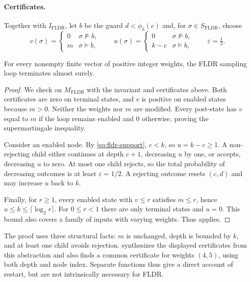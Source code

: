\paragraph{Certificates.}
Together with $I_{\mathrm{FLDR}}$, let $b$ be the guard
$d<\phi_h(c)$ and, for $\sigma\in S_{\mathrm{FLDR}}$, choose
\[
 v(\sigma)=\begin{cases}0&\sigma\not\models b,\\m&\sigma\models b,\end{cases}
 \qquad
 u(\sigma)=\begin{cases}0&\sigma\not\models b,\\k-c&\sigma\models b,\end{cases}
 \qquad \varepsilon=\tfrac12.
\]
\begin{theorem}
\label{thm:fldr}
For every nonempty finite vector of positive integer weights, the FLDR
sampling loop terminates almost surely.
\end{theorem}
\begin{proof}
We check  on $M_{\mathrm{FLDR}}$ with the
invariant and certificates above.
Both certificates are zero on terminal states, and $v$ is positive on
enabled states because $m>0$. Neither the weights nor $m$ are modified.
Every post-state has $v$ equal to $m$ if the loop remains enabled and
$0$ otherwise, proving the supermartingale inequality.

Consider an enabled node. By \eqref{eq:fldr-support}, $c<k$, so
$u=k-c\geq1$. A non-rejecting child either continues at depth $c+1$,
decreasing $u$ by one, or accepts, decreasing $u$ to zero. At most one
child rejects, so the total probability of decreasing outcomes is at
least $\varepsilon=1/2$. A rejecting outcome resets $(c,d)$ and may
increase $u$ back to $k$.

Finally, for $r\geq1$, every enabled state with $v\leq r$ satisfies
$m\leq r$, hence $u\leq k\leq\lceil\log_2r\rceil$.
For $0\leq r<1$ there are only terminal states and $u=0$.
This bound also covers a family of inputs with varying weights.
Thus  applies.
\end{proof}

The proof uses three structural facts: $m$ is unchanged, depth is bounded
by $k$, and at least one child avoids rejection.
 synthesizes the displayed certificates
from this abstraction and also finds a common certificate for weights
$(4,5)$, using both depth and node index. Separate functions thus give
a direct account of restart, but are not intrinsically necessary for FLDR.

